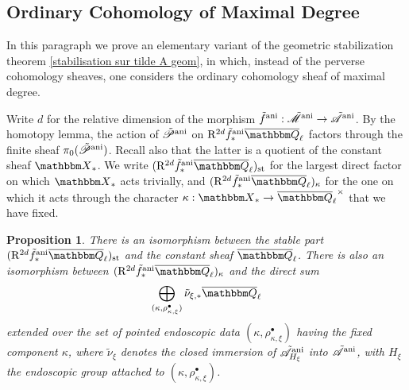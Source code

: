 \documentclass[12pt,english]{smfart}
\numberwithin{equation}{subsection}
\newtheorem{proposition}[equation]{Proposition}
\theoremstyle{remark}
\newcommand\calA{{\mathscr A}}
\newcommand\calP{{\mathscr P}}
\newcommand\calM{{\mathscr M}}
\newcommand\QQ{{\mathbbm Q}}
\newcommand\rmR{{\rm R}}
\newcommand\bbX{{\mathbbm X}}
\newcommand\ani{{\rm ani}}
\newcommand\Ql{{\overline\QQ_\ell}}
\begin{document}
\subsection{Ordinary Cohomology of Maximal Degree}\label{subsection : cohomologie ordinaire max}

In this paragraph we prove an elementary variant of the geometric stabilization theorem \ref{stabilisation sur tilde A geom}, in which, instead of the perverse cohomology sheaves, one considers the ordinary cohomology sheaf of maximal degree.

Write $d$ for the relative dimension of the morphism $\tilde f^\ani:\tilde\calM^\ani\rightarrow\tilde\calA^\ani$. By the homotopy lemma, the action of $\tilde\calP^\ani$ on $\rmR^{2d}\tilde f^\ani_*\Ql$ factors through the finite sheaf $\pi_0(\tilde\calP^\ani)$. Recall also that the latter is a quotient of the constant sheaf $\bbX_*$. We write $(\rmR^{2d}\tilde f^\ani_*\Ql)_{\rm st}$ for the largest direct factor on which $\bbX_*$ acts trivially, and $(\rmR^{2d}\tilde f^\ani_*\Ql)_\kappa$ for the one on which it acts through the character $\kappa:\bbX_*\rightarrow\Ql^\times$ that we have fixed.

\begin{proposition}\label{cohomologie ordinaire max}
There is an isomorphism between the stable part $(\rmR^{2d}\tilde f^\ani_*\Ql)_{\rm st}$ and the constant sheaf $\Ql$. There is also an isomorphism between $(\rmR^{2d}\tilde f^\ani_*\Ql)_\kappa$ and the direct sum
$$\bigoplus_{(\kappa,\rho^\bullet_{\kappa,\xi})}\tilde\nu_{\xi,*}\Ql$$
extended over the set of pointed endoscopic data $(\kappa,\rho^\bullet_{\kappa,\xi})$ having the fixed component $\kappa$, where $\tilde\nu_\xi$ denotes the closed immersion of $\tilde\calA_{H_\xi}^\ani$ into $\tilde\calA^\ani$, with $H_\xi$ the endoscopic group attached to $(\kappa,\rho^\bullet_{\kappa,\xi})$.
\end{proposition}
\end{document}
